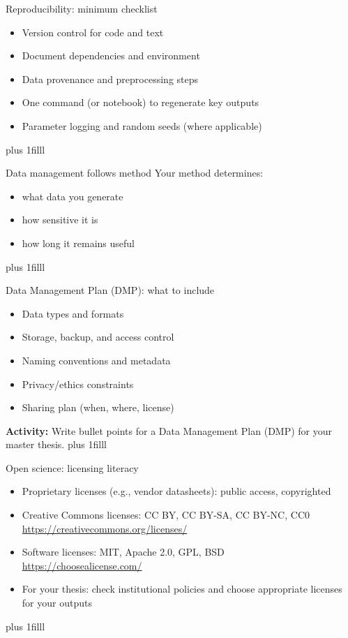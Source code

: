 \documentclass[aspectratio=169]{beamer}
\newcommand{\btVFill}{\vskip0pt plus 1filll}
\newcommand{\Activity}[1]{\textbf{Activity:} #1}
\begin{document}
\begin{frame}{Reproducibility: minimum checklist}
  \begin{itemize}
    \item Version control for code and text
    \item Document dependencies and environment
    \item Data provenance and preprocessing steps
    \item One command (or notebook) to regenerate key outputs
    \item Parameter logging and random seeds (where applicable)
  \end{itemize}
  \btVFill
\end{frame}

\begin{frame}{Data management follows method}
  Your method determines:
  \begin{itemize}
    \item what data you generate
    \item how sensitive it is
    \item how long it remains useful
  \end{itemize}
 \btVFill
\end{frame}


\begin{frame}{Data Management Plan (DMP): what to include}
  \begin{itemize}
    \item Data types and formats
    \item Storage, backup, and access control
    \item Naming conventions and metadata
    \item Privacy/ethics constraints
    \item Sharing plan (when, where, license)
  \end{itemize}\bigskip
\Activity{Write bullet points for a Data Management Plan (DMP) for your master thesis.}\btVFill\end{frame}


\begin{frame}{Open science: licensing literacy}
  \begin{itemize}
    \item Proprietary licenses (e.g., vendor datasheets): public access, copyrighted
    \item Creative Commons licenses: CC BY, CC BY-SA, CC BY-NC, CC0\\
      \url{https://creativecommons.org/licenses/}
      \item Software licenses: MIT, Apache 2.0, GPL, BSD\\
      \url{https://choosealicense.com/}
      \item For your thesis: check institutional policies and choose appropriate licenses for your outputs
  \end{itemize}
\btVFill\end{frame}
\end{document}
